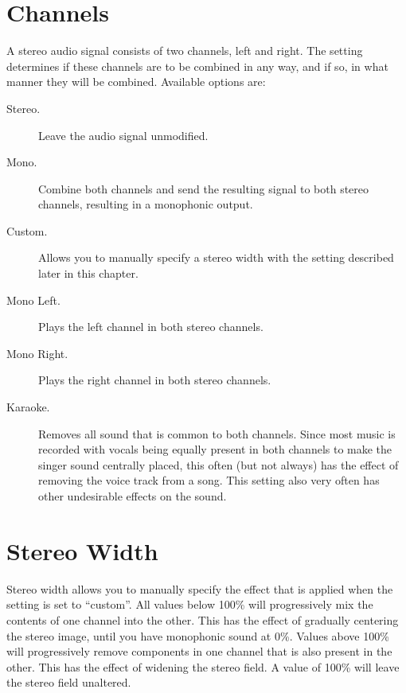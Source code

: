 \section{Channels}
  A stereo audio signal consists of two channels, left and right. The
   setting determines if these channels are to be combined in
  any way, and if so, in what manner they will be combined.
  Available options are:
  \begin{description}
      \item[Stereo.]
          Leave the audio signal unmodified.
      \item[Mono.]
          Combine both channels and send the resulting signal to both stereo
          channels, resulting in a monophonic output.
      \item[Custom.]
          Allows you to manually specify a stereo width with the
           setting described later in this chapter.
      \item[Mono Left.]
          Plays the left channel in both stereo channels.
      \item[Mono Right.]
          Plays the right channel in both stereo channels.
      \item[Karaoke.]
          Removes all sound that is common to both channels. Since most
          music is recorded with vocals being equally present in both channels
          to make the singer sound centrally placed, this often (but not
          always) has the effect of removing the voice track from a song. This
          setting also very often has other undesirable effects on the sound.
  \end{description}

\section{Stereo Width}
  Stereo width allows you to manually specify the effect that is applied
  when the  setting is set to ``custom''.
  All values below 100\% will progressively mix the contents of one channel
  into the other. This has the effect of gradually centering the stereo image,
  until you have monophonic sound at 0\%. Values above 100\% will progressively
  remove components in one channel that is also present in the other. This has
  the effect of widening the stereo field. A value of 100\% will leave the
  stereo field unaltered.


